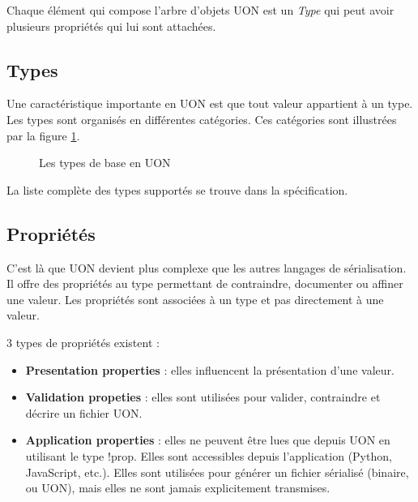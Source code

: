 \documentclass[
    iict, %
    il, %
]{heig-tb}
\begin{document}
Chaque élément qui compose l'arbre d'objets UON est un \emph{Type} qui peut avoir plusieurs propriétés qui lui sont attachées.

\subsection{Types}
Une caractéristique importante en UON est que tout valeur appartient à un type. Les types sont organisés en différentes catégories.
Ces catégories sont illustrées par la figure \ref{type-base}.

\begin{figure}[H]
    \begin{center}
    \end{center}
    \caption[Les types de base en UON]{\label{type-base}Les types de base en UON}
\end{figure}

La liste complète des types supportés se trouve dans la spécification.

\subsection{Propriétés}\label{properties}
C'est là que UON devient plus complexe que les autres langages de sérialisation.
Il offre des propriétés au type permettant de contraindre, documenter ou affiner une valeur. Les propriétés sont associées à un type et pas directement à une valeur.

3 types de propriétés existent :
\begin{itemize}
    \item \textbf{Presentation properties} : elles influencent la présentation d'une valeur.
    \item \textbf{Validation propeties} : elles sont utilisées pour valider, contraindre et décrire un fichier UON.
    \item \textbf{Application properties} : elles ne peuvent être lues que depuis UON en utilisant le type !prop. Elles sont accessibles depuis l'application (Python, JavaScript, etc.). Elles sont utilisées pour générer un fichier sérialisé (binaire, ou UON), mais elles ne sont jamais explicitement transmises.
\end{itemize}
\end{document}
